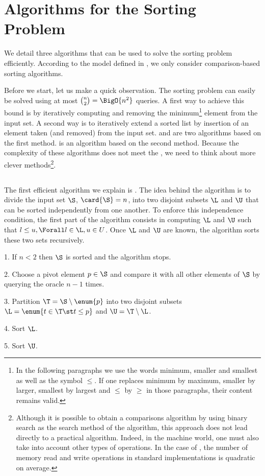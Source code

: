 \section{Algorithms for the Sorting Problem}
\label{tree:sorting:alg}

We detail three algorithms that can be used to solve the sorting
problem efficiently. According to the model defined in ,
we only consider comparison-based sorting algorithms.

Before we start, let us make a quick observation. The sorting problem can
easily be solved using at most \(\binom{n}{2} = \BigO{n^2}\) queries. A first
way to achieve this bound is by iteratively computing and removing the
minimum\footnote{In the following paragraphs we use the words minimum,
smaller
and smallest as well as the symbol \(\le\). If one replaces minimum by maximum,
smaller by larger, smallest by largest and \(\le\) by \(\ge\) in those paragraphs,
their content remains valid.}
element from the input set. A second way is to iteratively
extend a sorted list by insertion of an element taken (and removed) from
the input set. \selectionsort and \bubblesort are two algorithms based on the
first method. \insertionsort is an algorithm based on the second method.
Because the complexity of these algorithms does not meet the \ITLB, we need
to think about more clever methods\footnote{Although it is possible to obtain
a  comparisons algorithm by using binary search as the search
method of the \insertionsort algorithm, this approach does not lead directly to
a practical algorithm. Indeed, in the machine world, one must also take into
account other types of operations. In the case of \insertionsort,
the number of memory read and write operations in standard implementations is
quadratic on average.}.

\subsection{\quicksort}
The first efficient algorithm we explain is \quicksort \cite{hoare:1962}.
The idea behind the \quicksort algorithm is to divide the input set \(\S\),
\(\card{\S} = n\), into two disjoint subsets \(\L\) and \(\U\) that can be
sorted independently from one another. To enforce this independence condition,
the first part of the algorithm consists in computing \(\L\) and \(\U\) such
that \(l \le u, \Forall l \in \L, u \in U\). Once \(\L\) and \(\U\) are known,
the algorithm sorts these two sets recursively.
\begin{algorithm}[\quicksort]
\item[1.] If \(n < 2\) then \(\S\) is sorted and the algorithm stops.
\item[2.] Choose a pivot element \(p \in \S\) and compare it with all other
elements of \(\S\) by querying the oracle \(n - 1\) times.
\item[3.] Partition \(\T = \S \setminus \enum{p}\) into two disjoint subsets
\(\L = \enum{t \in \T \st t \le p}\) and \(\U = \T \setminus \L\).
\item[4.] Sort \(\L\).
\item[5.] Sort \(\U\).
\end{algorithm}

